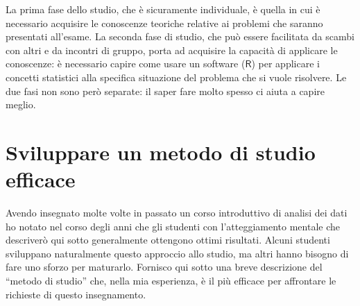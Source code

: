\documentclass[
  11pt,
]{krantz}
\begin{document}
La prima fase dello studio, che è sicuramente individuale, è quella in cui è necessario acquisire le conoscenze teoriche relative ai problemi che saranno presentati all'esame. La seconda fase di studio, che può essere facilitata da scambi con altri e da incontri di gruppo, porta ad acquisire la capacità di applicare le conoscenze: è necessario capire come usare un software (\(\textsf{R}\)) per applicare i concetti statistici alla specifica situazione del problema che si vuole risolvere. Le due fasi non sono però separate: il saper fare molto spesso ci aiuta a capire meglio.

\hypertarget{sviluppare-un-metodo-di-studio-efficace}{%
\section*{Sviluppare un metodo di studio efficace}\label{sviluppare-un-metodo-di-studio-efficace}}


Avendo insegnato molte volte in passato un corso introduttivo di analisi dei dati ho notato nel corso degli anni che gli studenti con l'atteggiamento mentale che descriverò qui sotto generalmente ottengono ottimi risultati. Alcuni studenti sviluppano naturalmente questo approccio allo studio, ma altri hanno bisogno di fare uno sforzo per maturarlo. Fornisco qui sotto una breve descrizione del ``metodo di studio'' che, nella mia esperienza, è il più efficace per affrontare le richieste di questo insegnamento.
\end{document}
